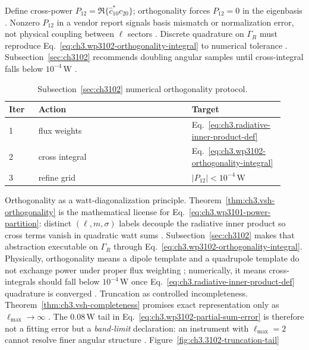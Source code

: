 Define cross-power \(P_{12}=\Re\{\widehat{c}_{10}^{*}c_{20}\}\); orthogonality forces \(P_{12}=0\) in the eigenbasis
\cite{hansen1988}. Nonzero \(P_{12}\) in a vendor report signals basis mismatch or normalization error, not
physical coupling between \(\ell\) sectors \cite{harrington2001}.
Discrete quadrature on \(\Gamma_R\) must reproduce Eq.~\eqref{eq:ch3.wp3102-orthogonality-integral} to numerical tolerance
\cite{hansen1988}. Subsection~\ref{sec:ch3102} recommends doubling angular samples until cross-integral falls below
\(10^{-4}\,\mathrm{W}\) \cite{harrington2001}.
\begin{table}[t]
\centering
\caption{Subsection~\ref{sec:ch3102} numerical orthogonality protocol.}
\label{tab:ch3.3102-numerical-protocol}
\small
\begin{tabular}{@{}p{0.10\linewidth}p{0.52\linewidth}p{0.30\linewidth}@{}}
\toprule
Iter & Action & Target \\
\midrule
1 & flux weights & Eq.~\eqref{eq:ch3.radiative-inner-product-def} \\
2 & cross integral & Eq.~\eqref{eq:ch3.wp3102-orthogonality-integral} \\
3 & refine grid & $|P_{12}|<10^{-4}\,\mathrm{W}$ \\
\bottomrule
\end{tabular}
\end{table}
Orthogonality as a watt-diagonalization principle. Theorem~\ref{thm:ch3.vsh-orthogonality} is the mathematical license for Eq.~\eqref{eq:ch3.wp3101-power-partition}: distinct
\((\ell,m,\sigma)\) labels decouple the radiative inner product so cross terms vanish in quadratic watt sums \cite{hansen1988}.
Subsection~\ref{sec:ch3102} makes that abstraction executable on \(\Gamma_R\) through Eq.~\eqref{eq:ch3.wp3102-orthogonality-integral}.
Physically, orthogonality means a dipole template and a quadrupole template do not exchange power under proper flux weighting
\cite{poynting1884}; numerically, it means cross-integrals should fall below \(10^{-4}\,\mathrm{W}\) once
Eq.~\eqref{eq:ch3.radiative-inner-product-def} quadrature is converged \cite{harrington2001}.
Truncation as controlled incompleteness. Theorem~\ref{thm:ch3.vsh-completeness} promises exact representation only as \(\ell_{\max}\to\infty\) \cite{kato1995}.
The \(0.08\,\mathrm{W}\) tail in Eq.~\eqref{eq:ch3.wp3102-partial-sum-error} is therefore not a fitting error but a \emph{band-limit}
declaration: an instrument with \(\ell_{\max}=2\) cannot resolve finer angular structure \cite{harrington2001}. Figure~\ref{fig:ch3.3102-truncation-tail}
